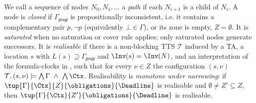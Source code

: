 
We call a sequence of nodes $N_0,N_1,\dots$ a \emph{path} if each $N_{i+1}$ is a child of $N_i$. 
%
A node is \emph{closed} if $\Gamma_{\mathsf{prop}}$ is propositionally inconsistent, i.e. it contains a
complementary pair $p,\neg p$ (equivalently $\bot\in\Gamma$), or its zone is empty, $Z=\emptyset$. It is
\emph{saturated} when no saturation or cover rule applies; only saturated nodes generate successors.
It is \emph{realisable} if there is a non-blocking TTS $\mathcal T$ induced by a TA, a location $s$ with
$L(s)\supseteq\Gamma_{\mathsf{prop}}$ and $\Inv(s)=\Inv(N)$, and an interpretation of the
formula-clocks in \obligations, such that for every $\nu \in Z$ the configuration $(s,\nu)$  $\mathcal T,(s,\nu)\models\textstyle\bigwedge\Gamma\ \wedge\ \bigwedge\Ctx$. Realisability is \emph{monotone under narrowing}: if $\tup{\Gamma}{\Ctx}{Z}{\obligations}{\Deadline}$ is realisable and
$\emptyset\neq Z'\subseteq Z$, then $\tup{\Gamma}{\Ctx}{Z'}{\obligations}{\Deadline}$ is realisable.



%

